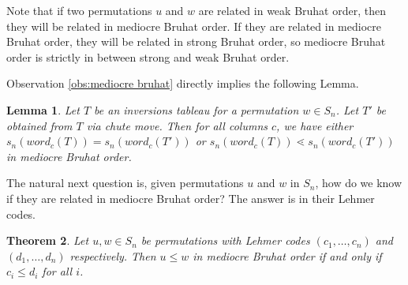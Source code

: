 \documentclass{article}
\newtheorem{theorem}{Theorem}[section]
\newtheorem{lemma}[theorem]{Lemma}
\theoremstyle{definition}
\begin{document}
Note that if two permutations $u$ and $w$ are related in weak Bruhat order, then they will be related in mediocre Bruhat order. If they are related in mediocre Bruhat order, they will be related in strong Bruhat order, so mediocre Bruhat order is strictly in between strong and weak Bruhat order.

Observation \ref{obs:mediocre bruhat} directly implies the following Lemma.


\begin{lemma}
\label{lemma:extended column}
    Let $T$ be an inversions tableau for a permutation $w \in S_n$. Let $T'$ be obtained from $T$ via chute move. Then for all columns $c$, we have either $s_n(word_c(T)) = s_n(word_c(T'))$ or $s_n(word_c(T)) \lessdot s_n(word_c(T'))$ in mediocre Bruhat order.
\end{lemma}


The natural next question is, given permutations $u$ and $w$ in $S_n$, how do we know if they are related in mediocre Bruhat order? The answer is in their Lehmer codes.

\begin{theorem}
\label{Thrm: mediocre Bruhat}
    Let $u,w \in S_n$ be permutations with Lehmer codes $(c_1, \dots , c_n)$ and $(d_1, \dots , d_n)$ respectively. Then $u \leq w$ in mediocre Bruhat order if and only if $c_i \leq d_i$ for all $i$.
\end{theorem}
\end{document}

